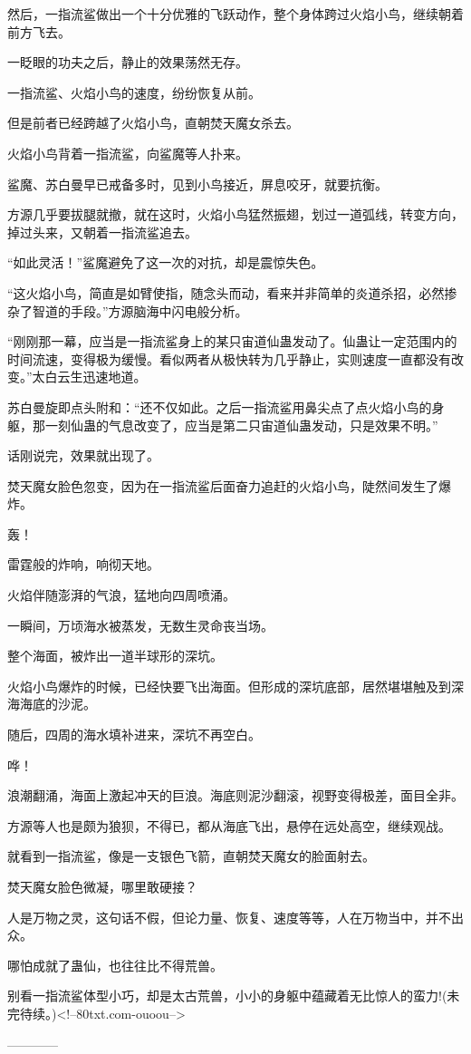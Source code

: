 \begin{this_body}
然后，一指流鲨做出一个十分优雅的飞跃动作，整个身体跨过火焰小鸟，继续朝着前方飞去。

一眨眼的功夫之后，静止的效果荡然无存。

一指流鲨、火焰小鸟的速度，纷纷恢复从前。

但是前者已经跨越了火焰小鸟，直朝焚天魔女杀去。

火焰小鸟背着一指流鲨，向鲨魔等人扑来。

鲨魔、苏白曼早已戒备多时，见到小鸟接近，屏息咬牙，就要抗衡。

方源几乎要拔腿就撤，就在这时，火焰小鸟猛然振翅，划过一道弧线，转变方向，掉过头来，又朝着一指流鲨追去。

“如此灵活！”鲨魔避免了这一次的对抗，却是震惊失色。

“这火焰小鸟，简直是如臂使指，随念头而动，看来并非简单的炎道杀招，必然掺杂了智道的手段。”方源脑海中闪电般分析。

“刚刚那一幕，应当是一指流鲨身上的某只宙道仙蛊发动了。仙蛊让一定范围内的时间流速，变得极为缓慢。看似两者从极快转为几乎静止，实则速度一直都没有改变。”太白云生迅速地道。

苏白曼旋即点头附和：“还不仅如此。之后一指流鲨用鼻尖点了点火焰小鸟的身躯，那一刻仙蛊的气息改变了，应当是第二只宙道仙蛊发动，只是效果不明。”

话刚说完，效果就出现了。

焚天魔女脸色忽变，因为在一指流鲨后面奋力追赶的火焰小鸟，陡然间发生了爆炸。

轰！

雷霆般的炸响，响彻天地。

火焰伴随澎湃的气浪，猛地向四周喷涌。

一瞬间，万顷海水被蒸发，无数生灵命丧当场。

整个海面，被炸出一道半球形的深坑。

火焰小鸟爆炸的时候，已经快要飞出海面。但形成的深坑底部，居然堪堪触及到深海海底的沙泥。

随后，四周的海水填补进来，深坑不再空白。

哗！

浪潮翻涌，海面上激起冲天的巨浪。海底则泥沙翻滚，视野变得极差，面目全非。

方源等人也是颇为狼狈，不得已，都从海底飞出，悬停在远处高空，继续观战。

就看到一指流鲨，像是一支银色飞箭，直朝焚天魔女的脸面射去。

焚天魔女脸色微凝，哪里敢硬接？

人是万物之灵，这句话不假，但论力量、恢复、速度等等，人在万物当中，并不出众。

哪怕成就了蛊仙，也往往比不得荒兽。

别看一指流鲨体型小巧，却是太古荒兽，小小的身躯中蕴藏着无比惊人的蛮力!(未完待续。)<!--80txt.com-ouoou-->

------------

\end{this_body}

